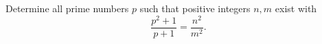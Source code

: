 Determine all prime numbers $p$ such that positive integers $n,m$ exist with
$$\frac{p^2+1}{p+1} = \frac{n^2}{m^2}.$$
